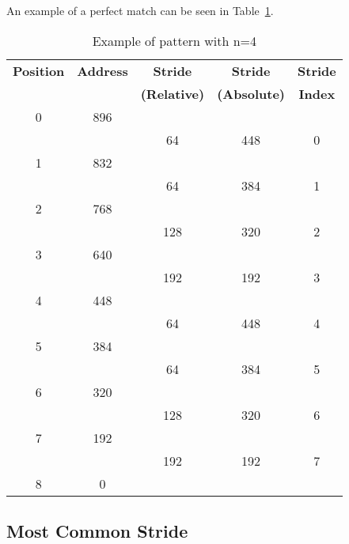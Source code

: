 An example of a perfect match can be seen in Table~\ref{table:pattern}.


\begin{table}[htb]
	\caption{Example of pattern with n=4}
	\label{table:pattern}
	\centering
	\begin{tabular}{c|c|c|c|c}
		\bfseries Position &
		\bfseries Address &
		\bfseries Stride &
		\bfseries Stride &
		\bfseries Stride \\
		& &
		\bfseries (Relative) &
		\bfseries (Absolute) &
		\bfseries Index \\
		\hline
		0 & 896   & & \\
		  &	& 64 & 448 & 0 \\
		1 & 832  & & \\
		  & & 64 & 384 & 1 \\
		2 & 768 & & \\
		  & & 128 & 320 & 2 \\
		3 & 640 & & \\
		  & & 192 & 192 & 3 \\
		4 & 448 & & \\
		  &	& 64 & 448 & 4 \\
		5 & 384 & & \\
		  &	& 64 & 384 & 5 \\
		6 & 320 & & \\
		  &	& 128 & 320 & 6 \\
		7 & 192 & & \\
		  &	& 192 & 192 & 7 \\
		8 & 0 & & \\
	\end{tabular}
\end{table}

\subsection{Most Common Stride}

